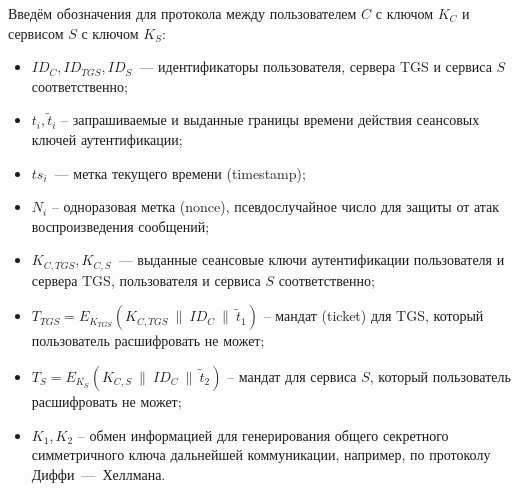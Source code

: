 Введём обозначения для протокола между пользователем $C$ с ключом $K_C$ и сервисом $S$ с ключом $K_S$:
\begin{itemize}
    \item $ID_C, ID_{TGS}, ID_S$~--- идентификаторы пользователя, сервера TGS и сервиса $S$ соответственно;
    \item $t_i, \tilde{t}_i$ -- запрашиваемые и выданные границы времени действия сеансовых ключей аутентификации;
    \item $ts_i$~--- метка текущего времени (timestamp);
    \item $N_i$ -- одноразовая метка (nonce), псевдослучайное число для защиты от атак воспроизведения сообщений;
    \item $K_{C,TGS}, K_{C,S}$~--- выданные сеансовые ключи аутентификации пользователя и сервера TGS, пользователя и сервиса $S$ соответственно;
    \item $T_{TGS} = E_{K_{TGS}}(K_{C,TGS} ~\|~ ID_C ~\|~ \tilde{t}_1)$ -- мандат (ticket) для TGS, который пользователь расшифровать не может;
    \item $T_{S} = E_{K_S}(K_{C,S} ~\|~ ID_C ~\|~ \tilde{t}_2)$ -- мандат для сервиса $S$, который пользователь расшифровать не может;
    \item $K_1, K_2$ -- обмен информацией для генерирования общего секретного симметричного ключа дальнейшей коммуникации, например, по протоколу Диффи~---~Хеллмана.
\end{itemize}

